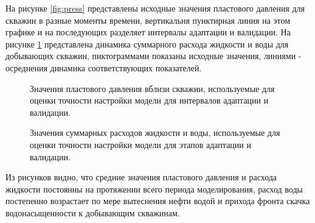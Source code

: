 \documentclass{article}
\begin{document}
На рисунке \ref{fig:press} представлены исходные значения пластового давления для скважин в разные моменты времени, вертикальня пунктирная линия на этом графике и на последующих разделяет интервалы адаптации и валидации. На рисунке \ref{fig:qlic} представлена динамика суммарного расхода жидкости и воды для добывающих скважин, пиктограммами показаны исходные значения, линиями - осреднения динамика соответствующих показателей.
\begin{figure} 
    \begin{minipage}[h]{0.48\linewidth}
      \caption{Значения пластового давления вблизи скважин, используемые для оценки точности настройки модели для интервалов адаптации и валидации.}
      \label{fig:press}
    \end{minipage} \hfill
    \begin{minipage}[h]{0.48\linewidth}
      \caption{Значения суммарных расходов жидкости и воды, используемые для оценки точности настройки модели для этапов адаптации и валидации.}
      \label{fig:qlic}
    \end{minipage} 
\end{figure}
Из рисунков видно, что средние значения пластового давления и расхода жидкости постоянны на протяжении всего периода моделирования, расход воды постепенно возрастает по мере вытеснения нефти водой и прихода фронта скачка  водонасыщенности к добывающим скважинам.
\end{document}
